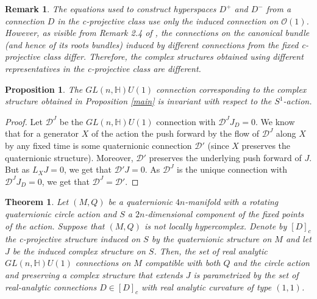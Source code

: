 \documentclass{amsart}
\newtheorem{thm}{Theorem}[section]
\newtheorem{rem}{Remark}[section]
\newtheorem{prop}{Proposition}[section]
\begin{document}
\begin{rem}\label{uni}
The equations used to construct hyperspaces $D^+$ and $D^-$ from a connection $D$ in the c-projective class use only the induced connection on $\mathcal{O}(1)$. However, as visible from Remark 2.4 of \cite{CEMN}, the connections on the canonical bundle (and hence of its roots bundles) induced by different connections from the fixed c-projective class differ. Therefore, the complex structures obtained using different representatives in the c-projective class are different. 
\end{rem}
\begin{prop}\label{con}
    The $GL(n,\mathbb{H})U(1)$ connection corresponding to the complex structure obtained in  Proposition \ref{main} is invariant with respect to the $S^1$-action.
\end{prop}
\begin{proof}
  Let $\mathcal{D}^J$ be the $GL(n,\mathbb{H})U(1)$ connection with $\mathcal{D}^J J_D=0$. We know that for a generator $X$ of the action the push forward by the flow of $\mathcal{D}^J$ along $X$ by any fixed time  is some quaternionic connection $\mathcal{D}'$ (since $X$ preserves the quaternionic structure). Moreover, $\mathcal{D}'$ preserves the underlying push forward of $J$.  But as $L_XJ=0$, we get that  $\mathcal{D}'J=0$. As  $\mathcal{D}^J$ is the unique connection with  $\mathcal{D}^J J_D=0$, we get that  $\mathcal{D}^J =\mathcal{D}'$. 
\end{proof}
\begin{thm}
    Let $(M,Q)$ be a quaternionic $4n$-manifold with a rotating quaternionic circle action and $S$ a $2n$-dimensional component of the fixed points of the action. Suppose that $(M,Q)$ is not locally hypercomplex. Denote by $[D]_c$ the c-projective structure induced on $S$ by the quaternionic structure on $M$ and let $J$ be the induced complex structure on $S$. Then,  the set of real analytic $GL(n,\mathbb{H})U(1)$ connections on $M$ compatible with both $Q$ and  the circle action and preserving a complex structure that extends $J$ is parametrized by the set of real-analytic connections $D\in[D]_c$ with real analytic curvature of type $(1,1)$.
\end{thm}
\end{document}
